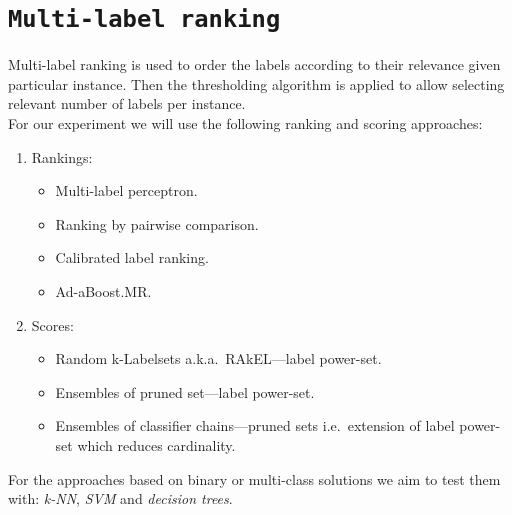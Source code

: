 \documentclass[12pt,a4paper,twocolumn]{article}
\begin{document}
\section*{\texttt{Multi-label ranking}}
Multi-label ranking is used to order the labels according to their relevance given particular instance. Then the thresholding algorithm is applied to allow selecting relevant number of labels per instance.\\
For our experiment we will use the following ranking and scoring approaches:
\begin{enumerate}
\item Rankings:
	\begin{itemize}
	\item Multi-label perceptron. %
	\item Ranking by pairwise comparison. %
	\item Calibrated label ranking. %
	\item Ad-aBoost.MR. %
	\end{itemize}
\item Scores:
	\begin{itemize}
	\item Random k-Labelsets a.k.a.\ RAkEL---label power-set. %
	\item Ensembles of pruned set---label power-set.
	\item Ensembles of classifier chains---pruned sets i.e.\ extension of label power-set which reduces cardinality.
	\end{itemize}
\end{enumerate}

For the approaches based on binary or multi-class solutions we aim to test them with: \emph{k-NN}, \emph{SVM} and \emph{decision trees}.
\end{document}
